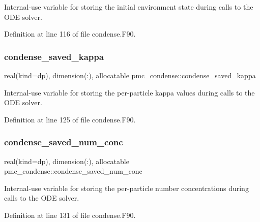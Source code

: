 Internal-\/use variable for storing the initial environment state during calls to the O\+DE solver. 



Definition at line 116 of file condense.\+F90.

\mbox{\label{namespacepmc__condense_a0829dc0e51b0c9843bfd0e3c36432a19}} 
\subsubsection{\texorpdfstring{condense\+\_\+saved\+\_\+kappa}{condense\_saved\_kappa}}
{\footnotesize\ttfamily real(kind=dp), dimension(\+:), allocatable pmc\+\_\+condense\+::condense\+\_\+saved\+\_\+kappa}



Internal-\/use variable for storing the per-\/particle kappa values during calls to the O\+DE solver. 



Definition at line 125 of file condense.\+F90.

\mbox{\label{namespacepmc__condense_ae5922bfbd484efd47db5593f15d0c0f4}} 
\subsubsection{\texorpdfstring{condense\+\_\+saved\+\_\+num\+\_\+conc}{condense\_saved\_num\_conc}}
{\footnotesize\ttfamily real(kind=dp), dimension(\+:), allocatable pmc\+\_\+condense\+::condense\+\_\+saved\+\_\+num\+\_\+conc}



Internal-\/use variable for storing the per-\/particle number concentrations during calls to the O\+DE solver. 



Definition at line 131 of file condense.\+F90.

\mbox{\label{namespacepmc__condense_a5bdbeab5c023573ed2f0a37bfa718f83}} 

